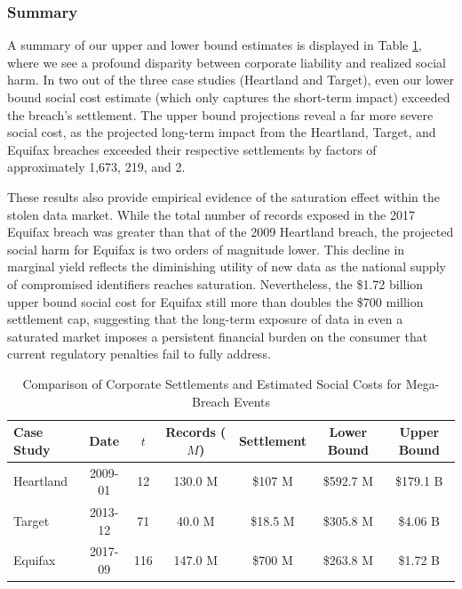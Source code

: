 \subsubsection{Summary}
A summary of our upper and lower bound estimates is displayed in Table \ref{tab:case_study_summary}, where we see a profound disparity between corporate liability and realized social harm. In two out of the three case studies (Heartland and Target), even our lower bound social cost estimate (which only captures the short-term impact) exceeded the breach's settlement. The upper bound projections reveal a far more severe social cost, as the projected long-term impact from the Heartland, Target, and Equifax breaches exceeded their respective settlements by factors of approximately 1,673, 219, and 2.

These results also provide empirical evidence of the saturation effect within the stolen data market. While the total number of records exposed in the 2017 Equifax breach was greater than that of the 2009 Heartland breach, the projected social harm for Equifax is two orders of magnitude lower. This decline in marginal yield reflects the diminishing utility of new data as the national supply of compromised identifiers reaches saturation. Nevertheless, the \$1.72 billion upper bound social cost for Equifax still more than doubles the \$700 million settlement cap, suggesting that the long-term exposure of data in even a saturated market imposes a persistent financial burden on the consumer that current regulatory penalties fail to fully address.


\begin{table}[h]
\centering
\caption{Comparison of Corporate Settlements and Estimated Social Costs for Mega-Breach Events}
\label{tab:case_study_summary}
\begin{tabular}{lcccccc}
\hline
\textbf{Case Study} & \textbf{Date} & \textbf{$t$} & \textbf{Records ($M$)} & \textbf{Settlement} & \textbf{Lower Bound} & \textbf{Upper Bound} \\ \hline
Heartland & 2009-01 & 12 & 130.0 M& \$107 M & \$592.7 M & \$179.1 B \\
Target & 2013-12 & 71 & 40.0 M& \$18.5 M & \$305.8 M & \$4.06 B \\
Equifax & 2017-09 & 116 & 147.0 M& \$700 M & \$263.8 M & \$1.72 B \\ \hline
\end{tabular}
\end{table}